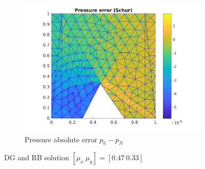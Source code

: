 \documentclass[graybox]{svmult}
\begin{document}
\begin{figure}
\begin{subfigure}{0.31\textwidth}
\includegraphics[width=\linewidth]{pressure_error_at_47_33.jpg}
\caption{Pressure absolute error $p_h-p_N$} \label{pre_error}
\end{subfigure}
\caption{DG and RB solution $[\mu_x \ \mu_y] = [0.47 \ 0.33]$} 
\label{dg_rb_solution_47_33}
\end{figure}
\end{document}
